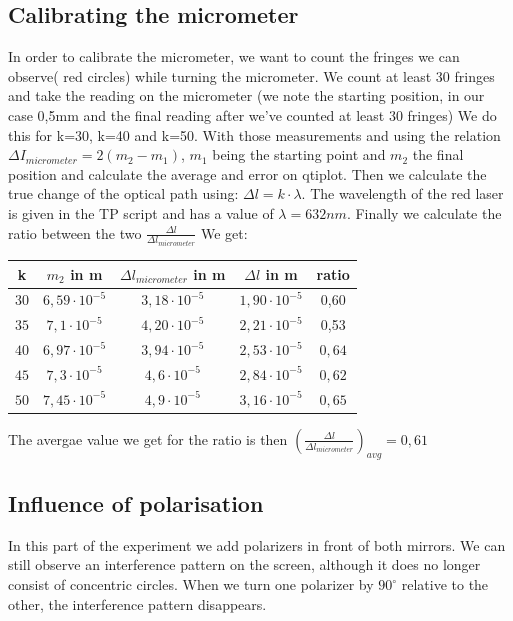 \documentclass{scrartcl}
\begin{document}
\subsection{Calibrating the micrometer}
In order to calibrate the micrometer, we want to count the fringes we can observe( red circles) while turning the micrometer.
 We count at least 30 fringes and take the reading on the micrometer (we note the starting position, in our case 0,5mm and the final reading after we've counted at least   30 fringes) We do this for k=30, k=40 and k=50. With those measurements and using the relation $\Delta I_{micrometer}= 2(m_2-m_1)$, $m_1$ being the starting point and $m_2$ the final position and calculate the average and error on qtiplot.
 Then we calculate the true change of the optical path using: $\Delta l= k \cdot \lambda$. The wavelength of the red laser is given in the TP script and has a value of $\lambda = 632 nm$. Finally we calculate the ratio between the two $\frac{\Delta l}{\Delta l_{micrometer}}$
 We get:
 
\medskip
\centering
\begin{tabular}{|c|c|c|c|c|}
    \hline
     k & $m_2$ in m & $\Delta l_{micrometer}$ in m & $\Delta l$ in m & ratio\\
     \hline
     $30$ & $6,59 \cdot 10^{-5}$ & $3,18 \cdot 10^{-5}$ & $1,90 \cdot 10^{-5}$ & 0,60 \\
     \hline
     $35$ & $7,1 \cdot 10^{-5}$ & $4,20 \cdot 10^{-5}$ & $2,21 \cdot 10^{-5}$ & 0,53 \\
     \hline
     $40$ & $6,97 \cdot 10^{-5}$ & $3,94 \cdot 10^{-5}$ & $2,53 \cdot 10^{-5}$ & $0,64$ \\
     \hline
     $45$ & $7,3 \cdot 10^{-5}$ & $4,6 \cdot 10^{-5}$ & $2,84\cdot 10^{-5}$ & $0,62$ \\
     \hline
     $50$ & $7,45 \cdot 10^{-5}$ & $4,9 \cdot 10^{-5}$ & $3,16 \cdot 10^{-5}$ &  $0,65$\\
     \hline
    \end{tabular}
\flushleft

The avergae value we get for the ratio is then $(\frac{\Delta l}{\Delta l_{micrometer}})_{avg} = 0,61$

\subsection{Influence of polarisation}
In this part of the experiment we add polarizers in front of both mirrors. We can still observe an interference pattern on the screen, although it does no longer consist of concentric circles. When we turn one polarizer by $90^\circ$ relative to the other, the interference pattern disappears. 
\end{document}

